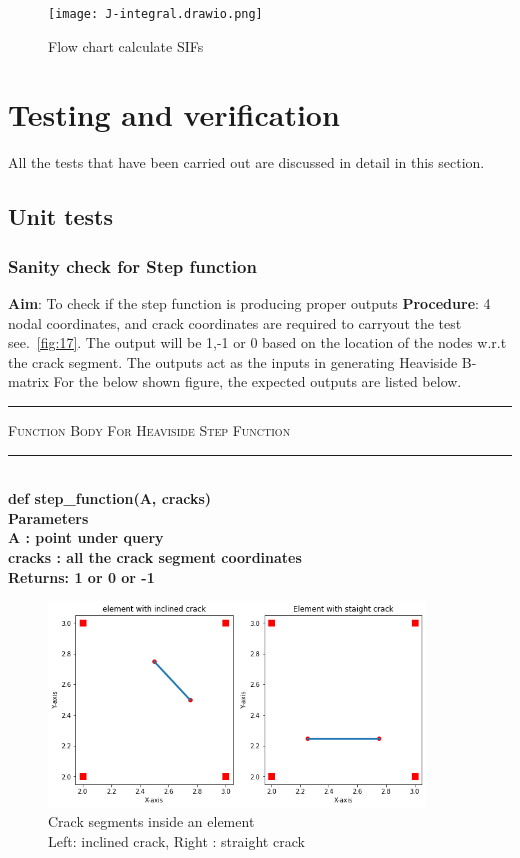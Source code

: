 \documentclass[fleqn, 12.5pt,a4paper]{report}
\begin{document}
\begin{figure}[H]
    \centering
    \texttt{[image: J-integral.drawio.png]}
    \caption{Flow chart calculate SIFs}
    \label{fig:16}
\end{figure}

\section{\large Testing and verification}
All the tests that have been carried out are discussed in detail in this section.
\subsection{\large Unit tests}
\subsubsection{Sanity check for Step function}
\textbf{Aim}: To check if the step function is producing proper outputs\newline
\textbf{Procedure}: 4 nodal coordinates, and crack coordinates are required to carryout the test see.~\autoref{fig:17}. The output will be 1,-1 or 0 based on the location of the nodes w.r.t the crack segment. The outputs act as the inputs in generating Heaviside B-matrix For the below shown figure, the expected outputs are listed below.
\\
{ \rule{\linewidth}{0.05cm}}
	{\scshape Function Body For Heaviside Step Function}\\
{ \rule{\linewidth}{0.05cm}}
{\selectfont
\\
\textbf{def step{\_}function(A, cracks)\\
    Parameters\\
    A : point under query\\
    cracks : all the crack segment coordinates\\
    Returns: 1 or 0 or -1\\
    }}
\begin{figure}[h]
    \centering
    \includegraphics[width = 10cm, scale = 0.30]{step function.png}
    \caption{Crack segments inside an element \\Left: inclined crack, Right : straight crack }
    \label{fig:17}
    \centering
\end{figure}   
\end{document}
